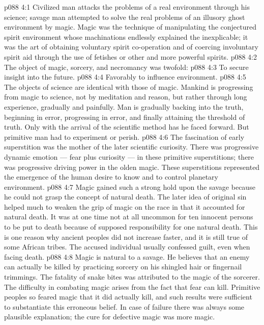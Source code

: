 \vs p088 4:1 Civilized man attacks the problems of a real environment through his science; savage man attempted to solve the real problems of an illusory ghost environment by magic. Magic was the technique of manipulating the conjectured spirit environment whose machinations endlessly explained the inexplicable; it was the art of obtaining voluntary spirit co\hyp{}operation and of coercing involuntary spirit aid through the use of fetishes or other and more powerful spirits.
\vs p088 4:2 The object of magic, sorcery, and necromancy was twofold:
\vs p088 4:3 \bibnobreakspace To secure insight into the future.
\vs p088 4:4 \bibnobreakspace Favorably to influence environment.
\vs p088 4:5 \pc The objects of science are identical with those of magic. Mankind is progressing from magic to science, not by meditation and reason, but rather through long experience, gradually and painfully. Man is gradually backing into the truth, beginning in error, progressing in error, and finally attaining the threshold of truth. Only with the arrival of the scientific method has he faced forward. But primitive man had to experiment or perish.
\vs p088 4:6 The fascination of early superstition was the mother of the later scientific curiosity. There was progressive dynamic emotion --- fear plus curiosity --- in these primitive superstitions; there was progressive driving power in the olden magic. These superstitions represented the emergence of the human desire to know and to control planetary environment.
\vs p088 4:7 Magic gained such a strong hold upon the savage because he could not grasp the concept of natural death. The later idea of original sin helped much to weaken the grip of magic on the race in that it accounted for natural death. It was at one time not at all uncommon for ten innocent persons to be put to death because of supposed responsibility for one natural death. This is one reason why ancient peoples did not increase faster, and it is still true of some African tribes. The accused individual usually confessed guilt, even when facing death.
\vs p088 4:8 Magic is natural to a savage. He believes that an enemy can actually be killed by practicing sorcery on his shingled hair or fingernail trimmings. The fatality of snake bites was attributed to the magic of the sorcerer. The difficulty in combating magic arises from the fact that fear can kill. Primitive peoples so feared magic that it did actually kill, and such results were sufficient to substantiate this erroneous belief. In case of failure there was always some plausible explanation; the cure for defective magic was more magic.
